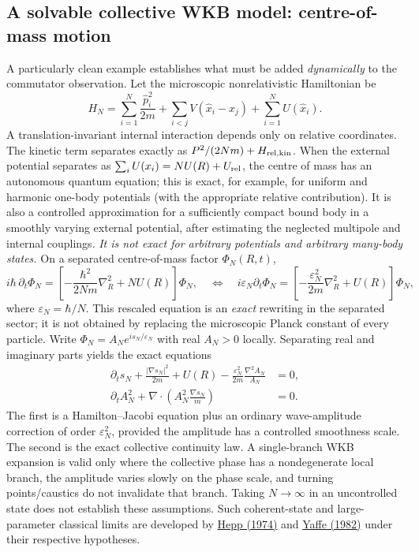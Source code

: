 \documentclass[11pt,a4paper]{article}
\begin{document}
\subsection{A solvable collective WKB model: centre-of-mass motion}
\label{subsec:qgd-largeN-COM}
A particularly clean example establishes what must be added \emph{dynamically} to the commutator observation. Let the microscopic nonrelativistic Hamiltonian be
\begin{equation}\label{eq:qgd-largeN-HN}
H_N=\sum_{i=1}^N\frac{\hat p_i^2}{2m}
+\sum_{i<j}V(\hat x_i-\hat x_j)+\sum_{i=1}^NU(\hat x_i).
\end{equation}
A translation-invariant internal interaction depends only on relative coordinates. The kinetic term separates exactly as $P^2/(2Nm)+H_{\rm rel,kin}$. When the external potential separates as $\sum_i U(x_i)=NU(R)+U_{\rm rel}$, the centre of mass has an autonomous quantum equation; this is exact, for example, for uniform and harmonic one-body potentials (with the appropriate relative contribution). It is also a controlled approximation for a sufficiently compact bound body in a smoothly varying external potential, after estimating the neglected multipole and internal couplings. \emph{It is not exact for arbitrary potentials and arbitrary many-body states.}
On a separated centre-of-mass factor $\Phi_N(R,t)$,
\begin{equation}\label{eq:qgd-largeN-COMschr}
 i\hbar\,\partial_t\Phi_N
=\left[-\frac{\hbar^2}{2Nm}\nabla_R^2+NU(R)\right]\Phi_N,
\quad\Longleftrightarrow\quad
 i\varepsilon_N\partial_t\Phi_N
=\left[-\frac{\varepsilon_N^2}{2m}\nabla_R^2+U(R)\right]\Phi_N,
\end{equation}
where $\varepsilon_N=\hbar/N$. This rescaled equation is an \emph{exact} rewriting in the separated sector; it is not obtained by replacing the microscopic Planck constant of every particle.
Write $\Phi_N=A_Ne^{is_N/\varepsilon_N}$ with real $A_N>0$ locally. Separating real and imaginary parts yields the exact equations
\begin{align}
\partial_ts_N+\frac{|\nabla s_N|^2}{2m}+U(R)
-\frac{\varepsilon_N^2}{2m}\frac{\nabla^2A_N}{A_N}&=0,
\label{eq:qgd-largeN-COMHJ}\\
\partial_t A_N^2+\nabla\cdot\left(A_N^2\frac{\nabla s_N}{m}\right)&=0.
\label{eq:qgd-largeN-COMtransport}
\end{align}
The first is a Hamilton--Jacobi equation plus an ordinary wave-amplitude correction of order $\varepsilon_N^2$, provided the amplitude has a controlled smoothness scale. The second is the exact collective continuity law. A single-branch WKB expansion is valid only where the collective phase has a nondegenerate local branch, the amplitude varies slowly on the phase scale, and turning points/caustics do not invalidate that branch. Taking $N\to\infty$ in an uncontrolled state does not establish these assumptions. Such coherent-state and large-parameter classical limits are developed by \href{https://doi.org/10.1007/BF01646348}{Hepp (1974)} and \href{https://doi.org/10.1103/RevModPhys.54.407}{Yaffe (1982)} under their respective hypotheses.
\end{document}
